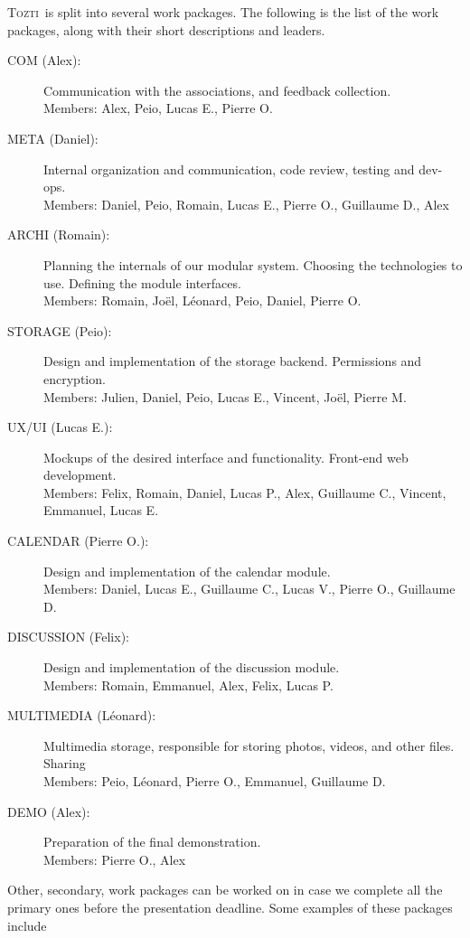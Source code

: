 \documentclass[a4paper, 12pt]{article}
\newcommand{\TOZTI}{\textsc{Tozti}\xspace}
\begin{document}
\TOZTI\ is split into several work packages. The following is the list of the work packages, along with their short descriptions and leaders.
\begin{description}
\item[COM (Alex):] Communication with the associations, and feedback collection.\\
Members: Alex, Peio, Lucas E., Pierre O.
\item[META (Daniel):] Internal organization and communication, code review, testing and dev-ops.\\
Members: Daniel, Peio, Romain, Lucas E., Pierre O., Guillaume D., Alex
\item[ARCHI (Romain):] Planning the internals of our modular system. Choosing the technologies to use. Defining the module interfaces. \\
Members: Romain, Joël, Léonard, Peio, Daniel, Pierre O.
\item[STORAGE (Peio):] Design and implementation of the storage backend. Permissions and encryption.\\
Members: Julien, Daniel, Peio, Lucas E., Vincent, Joël, Pierre M.
\item[UX/UI (Lucas E.):] Mockups of the desired interface and functionality. Front-end web development.\\
Members: Felix, Romain, Daniel, Lucas P., Alex, Guillaume C., Vincent, Emmanuel, Lucas E.
\item[CALENDAR (Pierre O.):] Design and implementation of the calendar module.\\
Members: Daniel, Lucas E., Guillaume C., Lucas V., Pierre O., Guillaume D.
\item[DISCUSSION (Felix):] Design and implementation of the discussion module.\\
Members: Romain, Emmanuel, Alex, Felix, Lucas P.
\item[MULTIMEDIA (Léonard):] Multimedia storage, responsible for storing photos, videos, and other files. Sharing\\
Members: Peio, Léonard, Pierre O., Emmanuel, Guillaume D.
\item[DEMO (Alex):] Preparation of the final demonstration.\\
Members: Pierre O., Alex
\end{description}

Other, secondary, work packages can be worked on in case we complete all the primary ones before the presentation deadline. Some examples of these packages include
\end{document}
